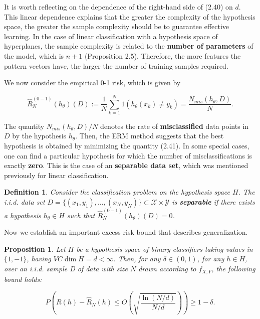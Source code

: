 \documentclass{report}
\newtheorem{definition}{Definition}[chapter]
\newtheorem{proposition}{Proposition}[chapter]
\begin{document}
It is worth reflecting on the dependence of the right-hand side of (2.40) on $d$. This linear dependence explains that the greater the complexity of the hypothesis space, the greater the sample complexity should be to guarantee effective learning. In the case of linear classification with a hypothesis space of hyperplanes, the sample complexity is related to the \textbf{number of parameters} of the model, which is $n + 1$ (Proposition 2.5). Therefore, the more features the pattern vectors have, the larger the number of training samples required.

We now consider the empirical 0-1 risk, which is given by

\begin{equation}
\hat{R}^{(0-1)}_N(h_\theta)(D) := \frac{1}{N}\sum_{k=1}^{N}1(h_\theta(x_k) \neq y_k) = \frac{N_{mis}(h_\theta,D)}{N}.
\end{equation}

The quantity $N_{mis}(h_\theta,D)/N$ denotes the rate of \textbf{misclassified} data points in $D$ by the hypothesis $h_\theta$. Then, the ERM method suggests that the best hypothesis is obtained by minimizing the quantity (2.41). In some special cases, one can find a particular hypothesis for which the number of misclassifications is exactly \textbf{zero}. This is the case of an \textbf{separable data set}, which was mentioned previously for linear classification.

\begin{definition}
Consider the classification problem on the hypothesis space $H$. The i.i.d. data set $D = \{(x_1,y_1), \dots, (x_N,y_N)\} \subset \mathcal{X} \times \mathcal{Y}$ is \textbf{separable} if there exists a hypothesis $h_\theta \in H$ such that $\hat{R}^{(0-1)}_N(h_\theta)(D) = 0$.
\end{definition}

Now we establish an important excess risk bound that describes generalization.

\begin{proposition}
Let $H$ be a hypothesis space of binary classifiers taking values in $\{1, -1\}$, having $VC\dim H = d < \infty$. Then, for any $\delta \in (0,1)$, for any $h \in H$, over an i.i.d. sample D of data with size $N$ drawn according to $f_{X,Y}$, the following bound holds:

\begin{equation}
P\left(R(h) - \hat{R}_N(h) \leq O\left(\sqrt{\frac{\ln(N/d)}{N/d}}\right)\right) \geq 1-\delta.
\end{equation}
\end{proposition}
\end{document}
